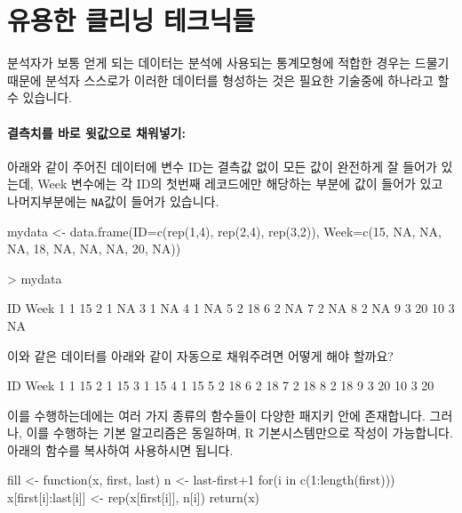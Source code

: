 \documentclass{book}
\begin{document}
\section{유용한 클리닝 테크닉들}

분석자가 보통 얻게 되는 데이터는 분석에 사용되는 통계모형에 적합한 경우는 드물기 때문에 분석자 스스로가 이러한 데이터를 형성하는 것은 필요한 기술중에 하나라고 할 수 있습니다.
% 

\paragraph{결측치를 바로 윗값으로 채워넣기: } 아래와 같이 주어진 데이터에 변수 ID는 결측값 없이 모든 값이 완전하게 잘 들어가 있는데, Week 변수에는 각 ID의 첫번째 레코드에만 해당하는 부분에 값이 들어가 있고 나머지부분에는 \texttt{NA}값이 들어가 있습니다. 

\begin{Schunk}
\begin{Soutput}
mydata <- data.frame(ID=c(rep(1,4), rep(2,4), rep(3,2)), Week=c(15, NA, NA, NA, 18, NA, NA, NA, 20, NA))

> mydata		

   ID Week
1   1   15
2   1   NA
3   1   NA
4   1   NA
5   2   18
6   2   NA
7   2   NA
8   2   NA
9   3   20
10  3   NA
\end{Soutput}
\end{Schunk}

이와 같은 데이터를 아래와 같이 자동으로 채워주려면 어떻게 해야 할까요? 	
	
\begin{Schunk}
\begin{Soutput}
   ID Week
1   1   15
2   1   15
3   1   15
4   1   15
5   2   18
6   2   18
7   2   18
8   2   18
9   3   20
10  3   20
\end{Soutput}
\end{Schunk}
	

이를 수행하는데에는 여러 가지 종류의 함수들이 다양한 패지키 안에 존재합니다.  
그러나, 이를 수행하는 기본 알고리즘은 동일하며, R 기본시스템만으로 작성이 가능합니다. 
아래의 함수를 복사하여 사용하시면 됩니다. 

\begin{Schunk}
	\begin{Soutput}
fill <- function(x, first, last){
	n <- last-first+1
	for(i in c(1:length(first))) x[first[i]:last[i]] <- rep(x[first[i]], n[i])
	return(x)
}
	\end{Soutput}
\end{Schunk}
\end{document}
